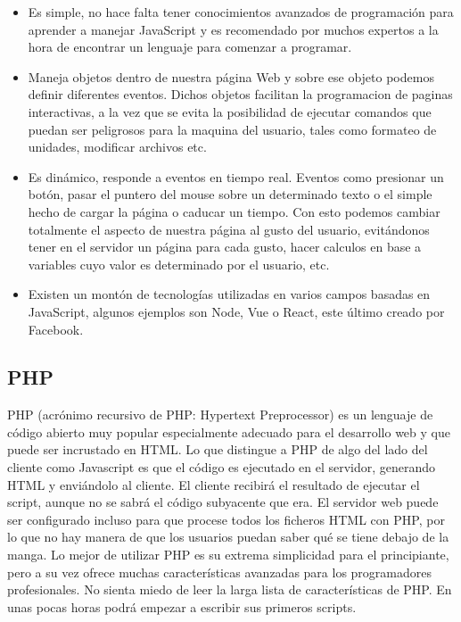 \documentclass[12pt]{book}
\begin{document}
\begin{itemize}
 	\item Es simple, no hace falta tener conocimientos avanzados de programación para aprender a manejar JavaScript y es recomendado por muchos expertos a la hora de encontrar un lenguaje para comenzar a programar.
 	\item Maneja objetos dentro de nuestra página Web y sobre ese objeto podemos definir diferentes eventos. Dichos objetos facilitan la programacion de paginas interactivas, a la vez que se evita la posibilidad de ejecutar comandos que puedan ser peligrosos para la maquina del usuario, tales como formateo de unidades, modificar archivos etc. 
 	\item Es dinámico, responde a eventos en tiempo real. Eventos como presionar un botón, pasar el puntero del mouse sobre un determinado texto o el simple hecho de cargar la página o caducar un tiempo. Con esto podemos cambiar totalmente el aspecto de nuestra página al gusto del usuario, evitándonos tener en el servidor un página para cada gusto, hacer calculos en base a variables cuyo valor es determinado por el usuario, etc. 
 	\item Existen un montón de tecnologías utilizadas en varios campos basadas en JavaScript, algunos ejemplos son Node, Vue o React, este último creado por Facebook.
 \end{itemize}

\subsection{PHP}
PHP (acrónimo recursivo de PHP: Hypertext Preprocessor) es un lenguaje de código abierto muy popular especialmente adecuado para el desarrollo web y que puede ser incrustado en HTML. Lo que distingue a PHP de algo del lado del cliente como Javascript es que el código es ejecutado en el servidor, generando HTML y enviándolo al cliente. El cliente recibirá el resultado de ejecutar el script, aunque no se sabrá el código subyacente que era. El servidor web puede ser configurado incluso para que procese todos los ficheros HTML con PHP, por lo que no hay manera de que los usuarios puedan saber qué se tiene debajo de la manga. Lo mejor de utilizar PHP es su extrema simplicidad para el principiante, pero a su vez ofrece muchas características avanzadas para los programadores profesionales. No sienta miedo de leer la larga lista de características de PHP. En unas pocas horas podrá empezar a escribir sus primeros scripts. 
\end{document}
